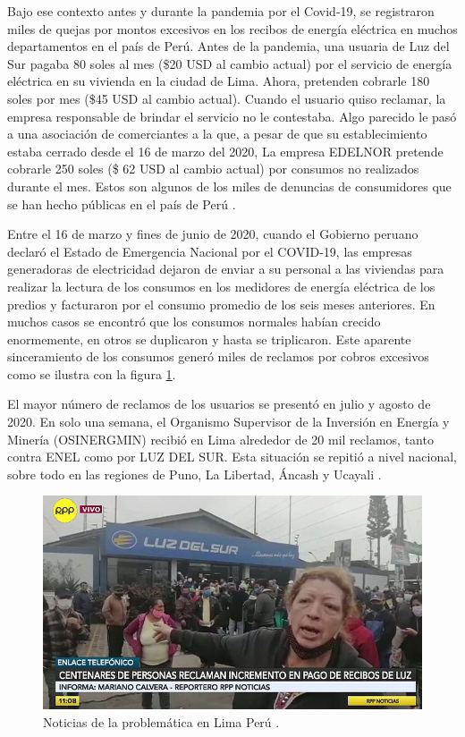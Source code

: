 Bajo ese contexto antes y durante la pandemia por el Covid-19, se registraron miles de quejas por montos excesivos en los recibos de energía eléctrica en muchos departamentos en el país de Perú. Antes de la pandemia, una usuaria de Luz del Sur pagaba 80 soles al mes (\$20 USD al cambio actual) por el servicio de energía eléctrica en su vivienda en la ciudad de Lima. Ahora, pretenden cobrarle 180 soles por mes (\$45 USD al cambio actual). Cuando el usuario quiso reclamar, la empresa responsable de brindar el servicio no le contestaba. Algo parecido le pasó a una asociación de comerciantes a la que, a pesar de que su establecimiento estaba cerrado desde el 16 de marzo del 2020, La empresa EDELNOR pretende cobrarle 250 soles (\$ 62 USD al cambio actual) por consumos no realizados durante el mes. Estos son algunos de los miles de denuncias de consumidores que se han hecho públicas en el país de Perú  \citep{WEBSITE:1}.

Entre el 16 de marzo y fines de junio de 2020, cuando el Gobierno peruano declaró el Estado de Emergencia Nacional por el COVID-19, las empresas generadoras de electricidad dejaron de enviar a su personal a las viviendas para realizar la lectura de los consumos en los medidores de energía eléctrica de los predios y facturaron por el consumo promedio de los seis meses anteriores. En muchos casos se encontró que los consumos normales habían crecido enormemente, en otros se duplicaron y hasta se triplicaron. Este aparente sinceramiento de los consumos generó miles de reclamos por cobros excesivos como se ilustra con la figura \ref{fig:noticia}. 

El mayor número de reclamos de los usuarios se presentó en julio y agosto de 2020. En solo una semana, el Organismo Supervisor de la Inversión en Energía y Minería (OSINERGMIN) recibió en Lima alrededor de 20 mil reclamos, tanto contra ENEL como por LUZ DEL SUR. Esta situación se repitió a nivel nacional, sobre todo en las regiones de Puno, La Libertad, Áncash y Ucayali \citep{WEBSITE:1}.

\begin{figure}[htbp]
\centering
\includegraphics[width=.7\textwidth]{./Figures/motivacion.jpg}
\caption{Noticias de la problemática en Lima Perú \protect\footnotemark.}
\label{fig:noticia}
\end{figure}

